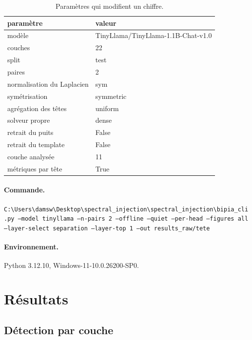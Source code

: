 \documentclass[11pt,a4paper]{article}
\begin{document}
\begin{table}[htbp]\centering\small
\begin{tabular}{ll}
\hline
paramètre & valeur \\
\hline
modèle & TinyLlama/TinyLlama-1.1B-Chat-v1.0 \\
couches & 22 \\
split & test \\
paires & 2 \\
normalisation du Laplacien & sym \\
symétrisation & symmetric \\
agrégation des têtes & uniform \\
solveur propre & dense \\
retrait du puits & False \\
retrait du template & False \\
couche analysée & 11 \\
métriques par tête & True \\
\hline
\end{tabular}
\caption{Paramètres qui modifient un chiffre.}
\label{tab:config}
\end{table}


\paragraph{Commande.}
\texttt{C:\textbackslash{}Users\textbackslash{}damsw\textbackslash{}Desktop\textbackslash{}spectral\_injection\textbackslash{}spectral\_injection\textbackslash{}bipia\_cli.py --model tinyllama --n-pairs 2 --offline --quiet --per-head --figures all --layer-select separation --layer-top 1 --out results\_raw/tete}

\paragraph{Environnement.}
Python 3.12.10, Windows-11-10.0.26200-SP0.


\section{Résultats}

\subsection{Détection par couche}
\end{document}
